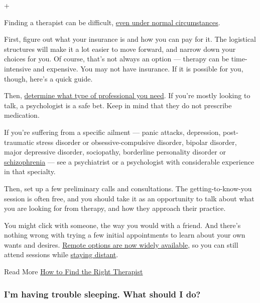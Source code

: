 +

Finding a therapist can be difficult,
\href{https://www.nytimes.com/2017/07/17/smarter-living/how-to-find-the-right-therapist.html}{even
under normal circumstances}.

First, figure out what your insurance is and how you can pay for it. The
logistical structures will make it a lot easier to move forward, and
narrow down your choices for you. Of course, that's not always an option
--- therapy can be time-intensive and expensive. You may not have
insurance. If it is possible for you, though, here's a quick guide.

Then,
\href{https://www.nytimes.com/2020/05/13/well/mind/prospective-therapist-interview-questions-online-virus.html}{determine
what type of professional you need}. If you're mostly looking to talk, a
psychologist is a safe bet. Keep in mind that they do not prescribe
medication.

If you're suffering from a specific ailment --- panic attacks,
depression, post-traumatic stress disorder or obsessive-compulsive
disorder, bipolar disorder, major depressive disorder, sociopathy,
borderline personality disorder or
\href{https://www.nytimes.com/2016/01/28/health/schizophrenia-cause-synaptic-pruning-brain-psychiatry.html}{schizophrenia}
--- see a psychiatrist or a psychologist with considerable experience in
that specialty.

Then, set up a few preliminary calls and consultations. The
getting-to-know-you session is often free, and you should take it as an
opportunity to talk about what you are looking for from therapy, and how
they approach their practice.

You might click with someone, the way you would with a friend. And
there's nothing wrong with trying a few initial appointments to learn
about your own wants and desires.
\href{https://www.nytimes.com/2020/05/13/well/mind/prospective-therapist-interview-questions-online-virus.html}{Remote
options are now widely available}, so you can still attend sessions
while
\href{https://www.nytimes.com/2020/07/09/well/mind/teletherapy-mental-health-coronavirus.html}{staying
distant}.

 Read More
\href{https://www.nytimes.com/2017/07/17/smarter-living/how-to-find-the-right-therapist.html}{How
to Find the Right Therapist}

\hypertarget{im-having-trouble-sleeping-what-should-i-do}{%
\subsubsection{I'm having trouble sleeping. What should I
do?}\label{im-having-trouble-sleeping-what-should-i-do}}

